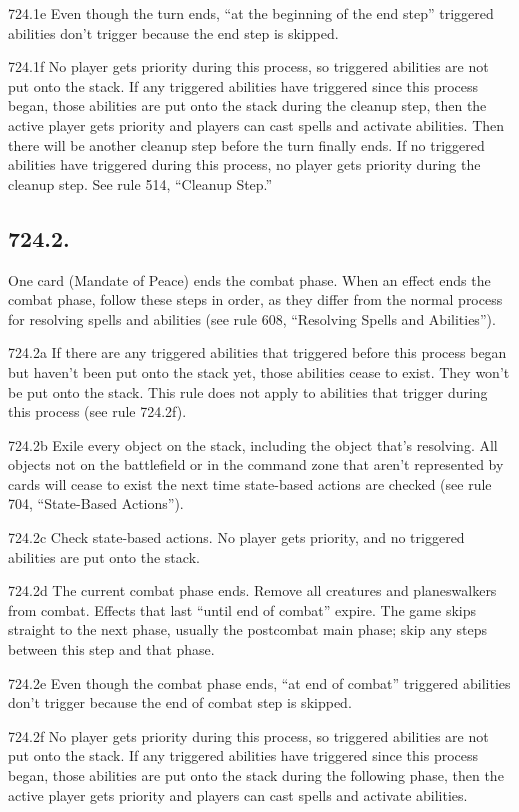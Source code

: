 724.1e Even though the turn ends, “at the beginning of the end step” triggered abilities don’t trigger because the end step is skipped.

724.1f No player gets priority during this process, so triggered abilities are not put onto the stack. If any triggered abilities have triggered since this process began, those abilities are put onto the stack during the cleanup step, then the active player gets priority and players can cast spells and activate abilities. Then there will be another cleanup step before the turn finally ends. If no triggered abilities have triggered during this process, no player gets priority during the cleanup step. See rule 514, “Cleanup Step.”

\subsection*{724.2.}
One card (Mandate of Peace) ends the combat phase. When an effect ends the combat phase, follow these steps in order, as they differ from the normal process for resolving spells and abilities (see rule 608, “Resolving Spells and Abilities”).

724.2a If there are any triggered abilities that triggered before this process began but haven’t been put onto the stack yet, those abilities cease to exist. They won’t be put onto the stack. This rule does not apply to abilities that trigger during this process (see rule 724.2f).

724.2b Exile every object on the stack, including the object that’s resolving. All objects not on the battlefield or in the command zone that aren’t represented by cards will cease to exist the next time state-based actions are checked (see rule 704, “State-Based Actions”).

724.2c Check state-based actions. No player gets priority, and no triggered abilities are put onto the stack.

724.2d The current combat phase ends. Remove all creatures and planeswalkers from combat. Effects that last “until end of combat” expire. The game skips straight to the next phase, usually the postcombat main phase; skip any steps between this step and that phase.

724.2e Even though the combat phase ends, “at end of combat” triggered abilities don’t trigger because the end of combat step is skipped.

724.2f No player gets priority during this process, so triggered abilities are not put onto the stack. If any triggered abilities have triggered since this process began, those abilities are put onto the stack during the following phase, then the active player gets priority and players can cast spells and activate abilities.

